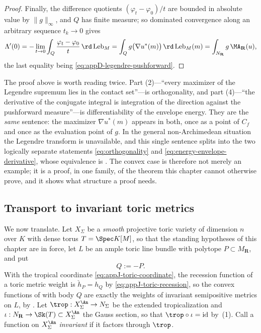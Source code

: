 \begin{proof}
Finally, the difference quotients
\((\varphi_t-\varphi_0)/t\) are bounded in absolute value by
\(\lVert g\rVert_\infty\), and \(Q\) has finite measure; so dominated
convergence along an arbitrary sequence \(t_k\to0\) gives
\[
 \Lambda'(0)
 =-\lim_{t\to0}\int_Q\frac{\varphi_t-\varphi_0}{t}\,
       \rd\operatorname{Leb}_M
 =\int_Qg\bigl(\nabla u^*(m)\bigr)\,\rd\operatorname{Leb}_M(m)
 =\int_{N_{\mathbf R}}g\,\MA_{\mathbf R}(u),
\]
the last equality being \eqref{eq:appD-legendre-pushforward}.
\end{proof}

\begin{remark}
\label{rem:ch27-one-computation}
The proof above is worth reading twice.  Part (2)---``every maximizer of the
Legendre supremum lies in the contact set''---is orthogonality, and part
(4)---``the derivative of the conjugate integral is integration of the
direction against the pushforward measure''---is differentiability of the
envelope energy.  They are the \emph{same} sentence: the maximizer
\(\nabla u^*(m)\) appears in both, once as a point of \(C_f\) and once as the
evaluation point of \(g\).  In the general non-Archimedean situation the
Legendre transform is unavailable, and this single sentence splits into the
two logically separate statements \eqref{eq:orthogonality} and
\eqref{eq:energy-envelope-derivative}, whose equivalence is
.  The convex case is
therefore not merely an example; it is a proof, in one family, of the
theorem this chapter cannot otherwise prove, and it shows what structure a
proof needs.
\end{remark}

\subsection{Transport to invariant toric metrics}
\label{sec:ch27-toric-transport}

We now translate.  Let \(X_\Sigma\) be a \emph{smooth} projective toric
variety of dimension \(n\) over \(K\) with dense torus \(T=\Spec K[M]\), so
that the standing hypotheses of this chapter are in force, let \(L\) be an
ample toric line bundle with polytope \(P\subset M_{\mathbf R}\), and put
\[
 Q:=-P .
\]
With the tropical coordinate \eqref{eq:appJ-toric-coordinate}, the recession
function of a toric metric weight is
\(\check h_P=h_Q\) by \eqref{eq:appJ-toric-recession}, so the convex
functions of  with body \(Q\) are
exactly the weights of invariant semipositive metrics on \(L\), by
.  Let \(\trop:X_\Sigma^{\An}\to
N_\Sigma\) be the extended tropicalization and
\(\iota:N_{\mathbf R}\to\Sk(T)\subset X_\Sigma^{\An}\) the Gauss section, so
that \(\trop\circ\iota=\operatorname{id}\) by
\,(1).  Call a function on \(X_\Sigma^{\An}\)
\emph{invariant} if it factors through \(\trop\).

